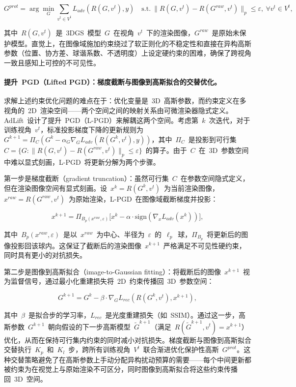 \begin{equation}
G^{prot} = \arg\min_G \sum_{v^t \in V^t} L_{adv}(R(G, v^t), y) \quad \text{s.t.}~\|R(G, v^t) - R(G^{raw}, v^t)\|_p \leq \varepsilon,~\forall v^t \in V^t,
\end{equation}

其中~$R(G, v^t)$~是~3DGS~模型~$G$~在视角~$v^t$~下的渲染图像，$G^{raw}$~是原始未保护模型。直觉上，在图像域施加约束绕过了软正则化的不稳定性和直接在异构高斯参数（位置、协方差、球谐系数、不透明度）上设定硬约束的困难，确保了跨视角一致且感知上可控的不可见性。

\paragraph{提升~PGD（Lifted PGD）：梯度截断与图像到高斯拟合的交替优化。}
求解上述约束优化问题的难点在于：优化变量是~3D~高斯参数，而约束定义在多视角的~2D~渲染空间——两个空间之间的映射关系由可微渲染器隐式定义。AdLift~设计了提升~PGD（L-PGD）来解耦这两个空间。考虑第~$k$~次迭代，对于训练视角~$v^t$，标准投影梯度下降的更新规则为~$G^{k+1} = \Pi_C(G^k - \alpha_G \nabla_G L_{adv}(R(G^k, v^t), y))$，其中~$\Pi_C$~是投影到可行集~$C = \{G : \|R(G, v^t) - R(G^{raw}, v^t)\|_p \leq \varepsilon\}$~的算子。由于~$C$~在~3D~参数空间中难以显式刻画，L-PGD~将更新分解为两个步骤。

第一步是梯度截断（gradient truncation）：虽然可行集~$C$~在参数空间隐式定义，但在渲染图像空间有显式刻画。设~$x^k = R(G^k, v^t)$~为当前渲染图像，$x^{raw} = R(G^{raw}, v^t)$~为原始渲染，L-PGD~在图像域截断梯度并投影：

\begin{equation}
x^{k+1} = \Pi_{B_p(x^{raw}, \varepsilon)}\!\bigl[x^k - \alpha \cdot \mathrm{sign}(\nabla_x L_{adv}(x^k))\bigr],
\end{equation}

其中~$B_p(x^{raw}, \varepsilon)$~是以~$x^{raw}$~为中心、半径为~$\varepsilon$~的~$\ell_p$~球，$\Pi_{B_p}$~将更新后的图像投影回该球内。这保证了截断后的渲染图像~$x^{k+1}$~严格满足不可见性硬约束，同时具有更小的对抗损失。

第二步是图像到高斯拟合（image-to-Gaussian fitting）：将截断后的图像~$x^{k+1}$~视为监督信号，通过最小化重建损失将~2D~约束传播回~3D~参数空间：

\begin{equation}
G^{k+1} = G^k - \beta \cdot \nabla_G L_{rec}(R(G^k, v^t), x^{k+1}),
\end{equation}

其中~$\beta$~是拟合步的学习率，$L_{rec}$~是光度重建损失（如~SSIM）。通过这一步，高斯参数~$G^{k+1}$~朝向假设的下一步高斯模型~$\tilde{G}^{k+1}$（满足~$R(\tilde{G}^{k+1}, v^t) = x^{k+1}$）优化，从而在保持可行集内约束的同时减小对抗损失。梯度截断与图像到高斯拟合交替执行~$K_p$~和~$K_l$~步，跨所有训练视角~$V^t$~联合渐进优化保护性高斯~$G^{prot}$。这种交替策略避免了在高斯参数上手动分配异构扰动预算的需要——每个中间更新都被约束为在视觉上与原始渲染不可区分，同时图像到高斯拟合将这些约束传播回~3D~空间。

